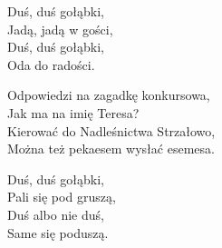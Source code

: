 \begin{text}
Duś, duś gołąbki,\\
Jadą, jadą w gości,\\
Duś, duś gołąbki,\\
Oda do radości.

Odpowiedzi na zagadkę konkursowa,\\
Jak ma na imię Teresa?\\
Kierować do Nadleśnictwa Strzałowo,\\
Można też pekaesem wysłać esemesa.

Duś, duś gołąbki,\\
Pali się pod gruszą,\\
Duś albo nie duś,\\
Same się poduszą.
\end{text}
\begin{chord}
\end{chord}